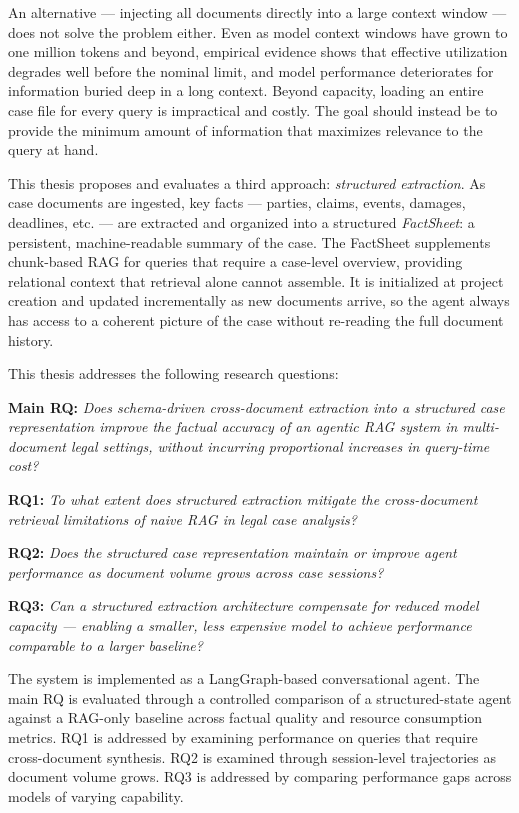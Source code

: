 An alternative --- injecting all documents directly into a large context window --- does
not solve the problem either. Even as model context windows have grown to one million
tokens and beyond, empirical evidence shows that effective utilization degrades well
before the nominal limit, and model performance deteriorates for information buried deep
in a long context. Beyond capacity, loading an entire case file for every query is
impractical and costly. The goal should instead be to provide the minimum amount of
information that maximizes relevance to the query at hand.

This thesis proposes and evaluates a third approach: \textit{structured extraction}. As
case documents are ingested, key facts --- parties, claims, events, damages, deadlines, etc. 
--- are extracted and organized into a structured \textit{FactSheet}: a persistent,
machine-readable summary of the case. The FactSheet supplements chunk-based RAG for
queries that require a case-level overview, providing relational context that retrieval
alone cannot assemble. It is initialized at project creation and updated incrementally
as new documents arrive, so the agent always has access to a coherent picture of the
case without re-reading the full document history.

This thesis addresses the following research questions:

\bigskip
\noindent\textbf{Main RQ:} \textit{Does schema-driven cross-document extraction into a
structured case representation improve the factual accuracy of an agentic RAG system in
multi-document legal settings, without incurring proportional increases in query-time cost?}

\bigskip
\noindent\textbf{RQ1:} \textit{To what extent does structured extraction mitigate the
cross-document retrieval limitations of naive RAG in legal case analysis?}

\noindent\textbf{RQ2:} \textit{Does the structured case representation maintain or improve
agent performance as document volume grows across case sessions?}

\noindent\textbf{RQ3:} \textit{Can a structured extraction architecture compensate for
reduced model capacity --- enabling a smaller, less expensive model to achieve performance
comparable to a larger baseline?}
\bigskip

The system is implemented as a LangGraph-based conversational agent. The main RQ is
evaluated through a controlled comparison of a structured-state agent against a RAG-only
baseline across factual quality and resource consumption metrics. RQ1 is addressed by
examining performance on queries that require cross-document synthesis. RQ2 is examined
through session-level trajectories as document volume grows. RQ3 is addressed by
comparing performance gaps across models of varying capability.

